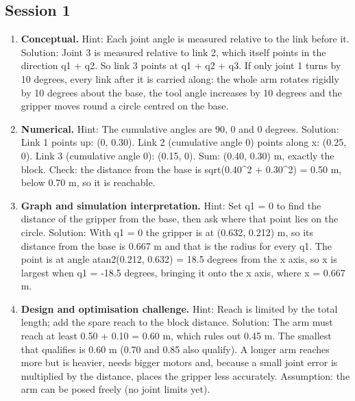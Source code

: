 \documentclass[11pt,a4paper]{article}
\begin{document}
\subsection*{Session 1}
\begin{enumerate}[nosep]
\item \textbf{Conceptual.} Hint: Each joint angle is measured relative to the link before it. Solution: Joint 3 is measured relative to link 2, which itself points in the direction q1 + q2. So link 3 points at q1 + q2 + q3. If only joint 1 turns by 10 degrees, every link after it is carried along: the whole arm rotates rigidly by 10 degrees about the base, the tool angle increases by 10 degrees and the gripper moves round a circle centred on the base.
\item \textbf{Numerical.} Hint: The cumulative angles are 90, 0 and 0 degrees. Solution: Link 1 points up: (0, 0.30). Link 2 (cumulative angle 0) points along x: (0.25, 0). Link 3 (cumulative angle 0): (0.15, 0). Sum: (0.40, 0.30) m, exactly the block. Check: the distance from the base is sqrt(0.40\textasciicircum{}2 + 0.30\textasciicircum{}2) = 0.50 m, below 0.70 m, so it is reachable.
\item \textbf{Graph and simulation interpretation.} Hint: Set q1 = 0 to find the distance of the gripper from the base, then ask where that point lies on the circle. Solution: With q1 = 0 the gripper is at (0.632, 0.212) m, so its distance from the base is 0.667 m and that is the radius for every q1. The point is at angle atan2(0.212, 0.632) = 18.5 degrees from the x axis, so x is largest when q1 = -18.5 degrees, bringing it onto the x axis, where x = 0.667 m.
\item \textbf{Design and optimisation challenge.} Hint: Reach is limited by the total length; add the spare reach to the block distance. Solution: The arm must reach at least 0.50 + 0.10 = 0.60 m, which rules out 0.45 m. The smallest that qualifies is 0.60 m (0.70 and 0.85 also qualify). A longer arm reaches more but is heavier, needs bigger motors and, because a small joint error is multiplied by the distance, places the gripper less accurately. Assumption: the arm can be posed freely (no joint limits yet).
\end{enumerate}
\end{document}
